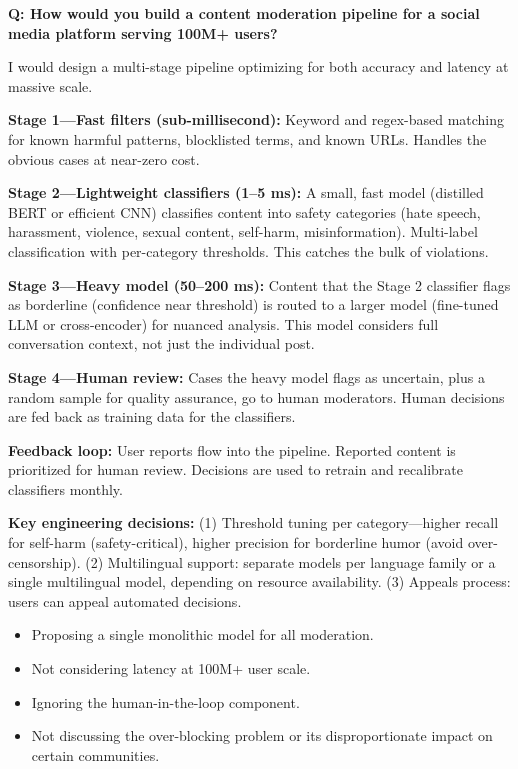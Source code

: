 \begin{interviewq}
\textbf{Q: How would you build a content moderation pipeline for a social
media platform serving 100M+ users?}

 \quad {} \quad \badgefreq{\freqmed}

\stronganswer
I would design a multi-stage pipeline optimizing for both accuracy and
latency at massive scale.

\textbf{Stage 1---Fast filters (sub-millisecond):}  Keyword and regex-based
matching for known harmful patterns, blocklisted terms, and known URLs.
Handles the obvious cases at near-zero cost.

\textbf{Stage 2---Lightweight classifiers (1--5 ms):}  A small, fast
model (distilled BERT or efficient CNN) classifies content into safety
categories (hate speech, harassment, violence, sexual content, self-harm,
misinformation).  Multi-label classification with per-category thresholds.
This catches the bulk of violations.

\textbf{Stage 3---Heavy model (50--200 ms):}  Content that the Stage 2
classifier flags as borderline (confidence near threshold) is routed to a
larger model (fine-tuned LLM or cross-encoder) for nuanced analysis.  This
model considers full conversation context, not just the individual post.

\textbf{Stage 4---Human review:}  Cases the heavy model flags as uncertain,
plus a random sample for quality assurance, go to human moderators.  Human
decisions are fed back as training data for the classifiers.

\textbf{Feedback loop:}  User reports flow into the pipeline.  Reported content
is prioritized for human review.  Decisions are used to retrain and recalibrate
classifiers monthly.

\textbf{Key engineering decisions:}  (1) Threshold tuning per category---higher
recall for self-harm (safety-critical), higher precision for borderline humor
(avoid over-censorship).  (2) Multilingual support: separate models per
language family or a single multilingual model, depending on resource
availability.  (3) Appeals process: users can appeal automated decisions.

\redflags
\begin{itemize}
    \item Proposing a single monolithic model for all moderation.
    \item Not considering latency at 100M+ user scale.
    \item Ignoring the human-in-the-loop component.
    \item Not discussing the over-blocking problem or its disproportionate
    impact on certain communities.
\end{itemize}


\end{interviewq}
